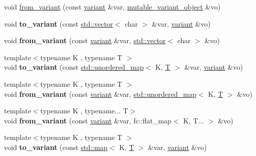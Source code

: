 \begin{DoxyCompactItemize}
\item 
void \mbox{\hyperlink{namespacefc_adfad35a920f576fa082cf140cdc44b63}{from\+\_\+variant}} (const \mbox{\hyperlink{classfc_1_1variant}{variant}} \&var, \mbox{\hyperlink{classfc_1_1mutable__variant__object}{mutable\+\_\+variant\+\_\+object}} \&vo)
\item 
\mbox{\label{namespacefc_ad83c4c989e49cd9bff36f55e7cc130ae}} 
void {\bfseries to\+\_\+variant} (const \mbox{\hyperlink{classstd_1_1vector}{std\+::vector}}$<$ char $>$ \&var, \mbox{\hyperlink{classfc_1_1variant}{variant}} \&vo)
\item 
\mbox{\label{namespacefc_a306910450a5ab303bed508cdc362896f}} 
void {\bfseries from\+\_\+variant} (const \mbox{\hyperlink{classfc_1_1variant}{variant}} \&var, \mbox{\hyperlink{classstd_1_1vector}{std\+::vector}}$<$ char $>$ \&vo)
\item 
\mbox{\label{namespacefc_ae0c80c8ef2241156ce295703938e7c2d}} 
{\footnotesize template$<$typename K , typename T $>$ }\\void {\bfseries to\+\_\+variant} (const \mbox{\hyperlink{classstd_1_1unordered__map}{std\+::unordered\+\_\+map}}$<$ K, \mbox{\hyperlink{struct_t}{T}} $>$ \&var, \mbox{\hyperlink{classfc_1_1variant}{variant}} \&vo)
\item 
\mbox{\label{namespacefc_a9718f0faaf81c6a1ffc0f56948905b98}} 
{\footnotesize template$<$typename K , typename T $>$ }\\void {\bfseries from\+\_\+variant} (const \mbox{\hyperlink{classfc_1_1variant}{variant}} \&var, \mbox{\hyperlink{classstd_1_1unordered__map}{std\+::unordered\+\_\+map}}$<$ K, \mbox{\hyperlink{struct_t}{T}} $>$ \&vo)
\item 
\mbox{\label{namespacefc_aeee831ea305fc0103408120f24b17f90}} 
{\footnotesize template$<$typename K , typename... T$>$ }\\void {\bfseries from\+\_\+variant} (const \mbox{\hyperlink{classfc_1_1variant}{variant}} \&var, fc\+::flat\+\_\+map$<$ K, T... $>$ \&vo)
\item 
\mbox{\label{namespacefc_a0ccbe1a6017296a785a791f2a935ea00}} 
{\footnotesize template$<$typename K , typename T $>$ }\\void {\bfseries to\+\_\+variant} (const \mbox{\hyperlink{classstd_1_1map}{std\+::map}}$<$ K, \mbox{\hyperlink{struct_t}{T}} $>$ \&var, \mbox{\hyperlink{classfc_1_1variant}{variant}} \&vo)

\end{DoxyCompactItemize}
